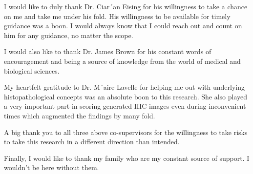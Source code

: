 

\begin{acknowledgements}      %

I would like to duly thank  Dr. Ciar´an Eising for his willingness to take a chance on me and take me under his fold. His willingness to be available for timely guidance was a boon. I would always know that I could reach out and count on him for any guidance, no matter the scope.

I would also like to thank Dr. James Brown for his constant words of encouragement and being a source of knowledge from the world of medical and biological sciences.

 My heartfelt gratitude to Dr. M´aire Lavelle for helping me out with underlying histopathological concepts was an absolute boon to this research. She also played a very important part in scoring generated IHC images even during inconvenient times which augmented the findings by many fold.

A big thank you to all three above co-supervisors for the willingness to take risks to take this research in a different direction than intended.

Finally, I would like to thank my family who are my constant source of support. I wouldn't be here without them.


\end{acknowledgements}



